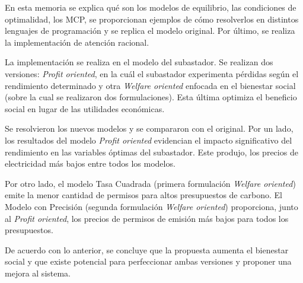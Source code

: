 En esta memoria se explica qué son los modelos de equilibrio, las condiciones de optimalidad, los MCP, se proporcionan ejemplos de cómo resolverlos en distintos lenguajes de programación y se replica el modelo original. Por último, se realiza la implementación de atención racional.
\vspace{2.5mm}

La implementación se realiza en el modelo del subastador. Se realizan dos versiones: \textit{Profit oriented}, en la cuál el subastador experimenta pérdidas según el rendimiento determinado y otra \emph{Welfare oriented} enfocada en el bienestar social (sobre la cual se realizaron dos formulaciones). Esta última optimiza el beneficio social en lugar de las utilidades económicas. 
\vspace{2.5mm}

Se resolvieron los nuevos modelos y se compararon con el original. Por un lado, los resultados del modelo \textit{Profit oriented} evidencian el impacto significativo del rendimiento en las variables óptimas del subastador. Este produjo, los precios de electricidad más bajos entre todos los modelos.
\vspace{2.5mm}

Por otro lado, el modelo Tasa Cuadrada (primera formulación \emph{Welfare oriented}) emite la menor cantidad de permisos para altos presupuestos de carbono. El Modelo con Precisión (segunda formulación \emph{Welfare oriented}) proporciona, junto al \textit{Profit oriented}, los precios de permisos de emisión más bajos para todos los presupuestos.
\vspace{2.5mm}

De acuerdo con lo anterior, se concluye que la propuesta aumenta el bienestar social y que existe potencial para perfeccionar ambas versiones y proponer una mejora al sistema.







  \cleardoublepage
  \tableofcontents
  \cleardoublepage
  \listoffigures
  \cleardoublepage
  \listoftables
  \cleardoublepage

  \normalsize

